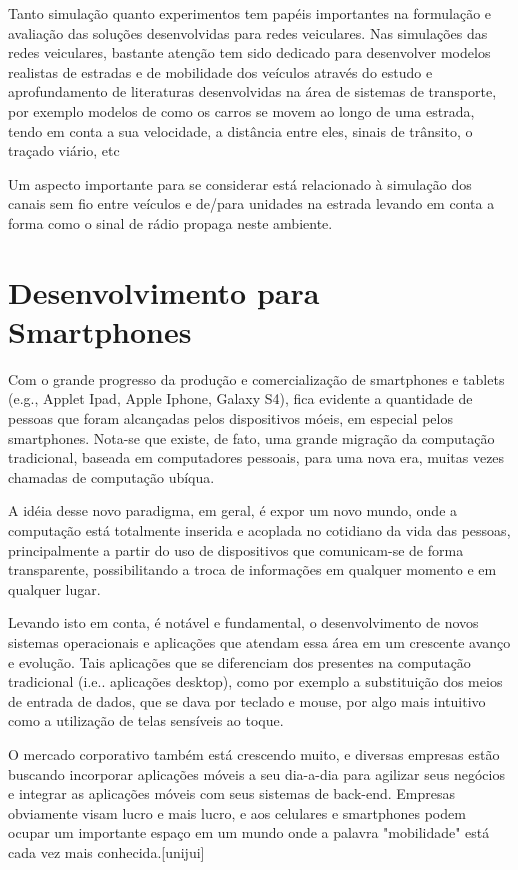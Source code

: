 \documentclass[12pt, %
openright, 
oneside, %
a4paper,    %
brazil]{facom-ufu-abntex2}
\begin{document}
Tanto simulação quanto experimentos tem papéis importantes na formulação e avaliação das soluções desenvolvidas para redes veiculares. Nas simulações das redes veiculares, bastante atenção tem sido dedicado para desenvolver modelos realistas de estradas e de mobilidade dos veículos através do estudo e aprofundamento de literaturas desenvolvidas na área de sistemas de transporte, por exemplo modelos de como os carros se movem ao longo de uma estrada, tendo em conta a sua velocidade, a distância entre eles, sinais de trânsito, o traçado viário, etc

Um aspecto importante para se considerar está relacionado à simulação dos canais sem fio entre veículos e de/para unidades na estrada levando em conta a forma como o sinal de rádio propaga neste ambiente.

\section{Desenvolvimento para Smartphones}

Com o grande progresso da produção e comercialização de smartphones e tablets (e.g., Applet Ipad, Apple Iphone, Galaxy S4), fica evidente a quantidade de pessoas que foram alcançadas pelos dispositivos móeis, em especial pelos smartphones. Nota-se que existe, de fato, uma grande migração da computação tradicional, baseada em computadores pessoais, para uma nova era, muitas vezes chamadas de computação ubíqua.

 A idéia desse novo paradigma, em geral, é expor um novo mundo, onde a computação está totalmente inserida e acoplada no cotidiano da vida das pessoas, principalmente a partir do uso de dispositivos que comunicam-se de forma transparente, possibilitando a troca de informações em qualquer momento e em qualquer lugar.

Levando isto em conta, é notável e fundamental, o desenvolvimento de novos sistemas operacionais e aplicações que atendam essa área em um crescente avanço e evolução. Tais aplicações que se diferenciam dos presentes na computação tradicional (i.e.. aplicações desktop), como por exemplo a substituição dos meios de entrada de dados, que se dava por teclado e mouse, por algo mais intuitivo como a utilização de telas sensíveis ao toque.

O mercado corporativo também está crescendo muito, e diversas empresas estão buscando incorporar aplicações móveis a seu dia-a-dia para agilizar seus negócios e integrar as aplicações móveis com seus sistemas de back-end. Empresas obviamente visam lucro e mais lucro, e aos celulares e smartphones podem ocupar um importante espaço em um mundo onde a palavra "mobilidade" está cada vez mais conhecida.[unijui]
\end{document}
